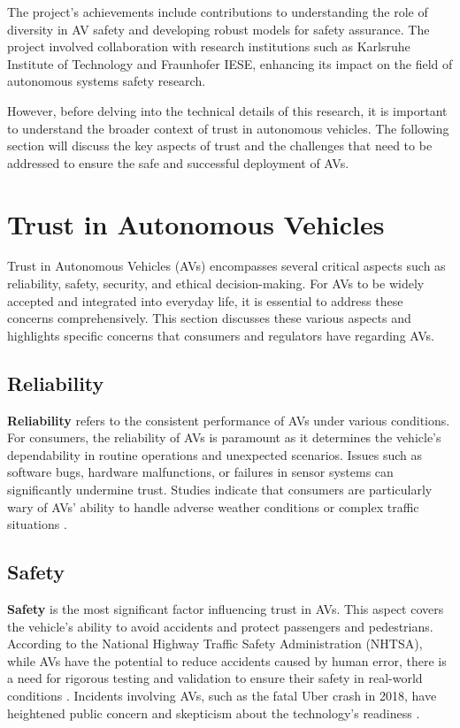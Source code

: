 The project's achievements include contributions to understanding the role of diversity in AV safety and developing robust models for safety assurance. The project involved collaboration with research institutions such as Karlsruhe Institute of Technology and Fraunhofer IESE, enhancing its impact on the field of autonomous systems safety research.

However, before delving into the technical details of this research, it is important to understand the broader context of trust in autonomous vehicles. The following section will discuss the key aspects of trust and the challenges that need to be addressed to ensure the safe and successful deployment of AVs.

\section{Trust in Autonomous Vehicles}

Trust in Autonomous Vehicles (AVs) encompasses several critical aspects such as reliability, safety, security, and ethical decision-making. For AVs to be widely accepted and integrated into everyday life, it is essential to address these concerns comprehensively. This section discusses these various aspects and highlights specific concerns that consumers and regulators have regarding AVs.

\subsection{Reliability}
\textbf{Reliability} refers to the consistent performance of AVs under various conditions. For consumers, the reliability of AVs is paramount as it determines the vehicle's dependability in routine operations and unexpected scenarios. Issues such as software bugs, hardware malfunctions, or failures in sensor systems can significantly undermine trust. Studies indicate that consumers are particularly wary of AVs' ability to handle adverse weather conditions or complex traffic situations \cite{gogoll2017}.

\subsection{Safety}
\textbf{Safety} is the most significant factor influencing trust in AVs. This aspect covers the vehicle's ability to avoid accidents and protect passengers and pedestrians. According to the National Highway Traffic Safety Administration (NHTSA), while AVs have the potential to reduce accidents caused by human error, there is a need for rigorous testing and validation to ensure their safety in real-world conditions \cite{nhtsa2020}. Incidents involving AVs, such as the fatal Uber crash in 2018, have heightened public concern and skepticism about the technology’s readiness \cite{goodall2016}.

